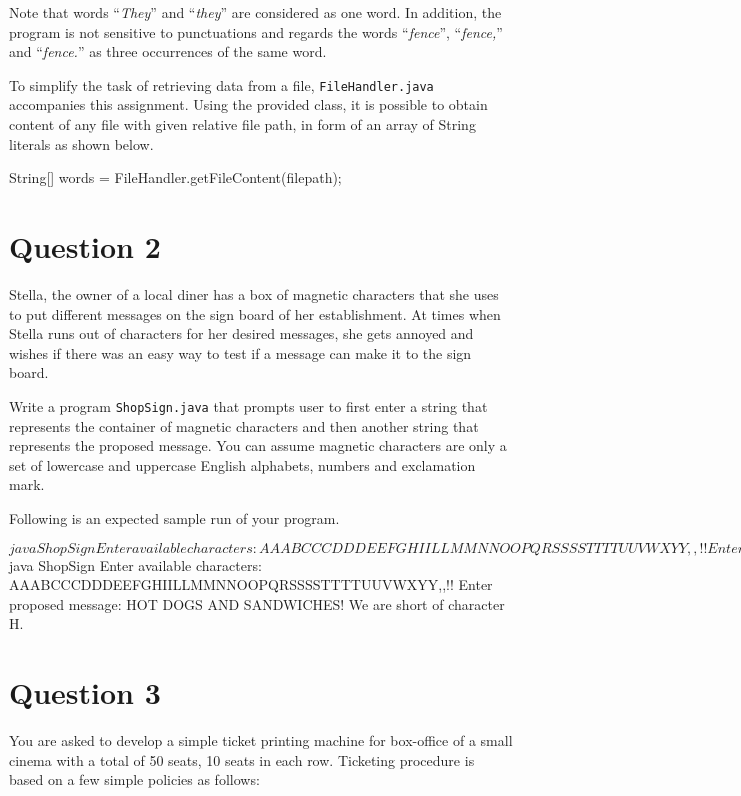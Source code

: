 \documentclass[12pt,letterpaper,twoside]{article}
\begin{document}
Note that words ``\textit{They}'' and ``\textit{they}'' are considered as one word.
In addition, the program is not sensitive to punctuations and regards the words ``\textit{fence}'', ``\textit{fence,}'' and ``\textit{fence.}'' as three occurrences of the same word.

To simplify the task of retrieving data from a file, \texttt{FileHandler.java} accompanies this assignment.
Using the provided class, it is possible to obtain content of any file with given relative file path, in form of an array of String literals as shown below.

\begin{terminal}
String[] words = FileHandler.getFileContent(filepath);
\end{terminal}

\section*{Question 2}

Stella, the owner of a local diner has a box of magnetic characters that she uses to put different messages on the sign board of her establishment.
At times when Stella runs out of characters for her desired messages, she gets annoyed and wishes if there was an easy way to test if a message can make it to the sign board.

Write a program \texttt{ShopSign.java} that prompts user to first enter a string that represents the container of magnetic characters and then another string that represents the proposed message.
You can assume magnetic characters are only a set of lowercase and uppercase English alphabets, numbers and exclamation mark.

Following is an expected sample run of your program.

\begin{terminal}
$ java ShopSign
Enter available characters:
AAABCCCDDDEEFGHIILLMMNNOOPQRSSSSTTTTUUVWXYY,,!!
Enter proposed message: HOT DOGS AND BUNS!
The message makes it to the sign board.
$ java ShopSign
Enter available characters:
AAABCCCDDDEEFGHIILLMMNNOOPQRSSSSTTTTUUVWXYY,,!!
Enter proposed message: HOT DOGS AND SANDWICHES!
We are short of character H.
\end{terminal}

\section*{Question 3}

You are asked to develop a simple ticket printing machine for box-office of a small cinema with a total of 50 seats, 10 seats in each row.
Ticketing procedure is based on a few simple policies as follows:
\end{document}
